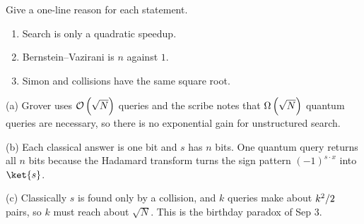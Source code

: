 \begin{exercisebox}
\begin{pproblem}\label{pp:reasons}
    Give a one-line reason for each statement.
    \begin{enumerate}[label=(\alph*)]
        \item Search is only a quadratic speedup.
        \item Bernstein--Vazirani is $n$ against $1$.
        \item Simon and collisions have the same square root.
    \end{enumerate}
\end{pproblem}
\tcblower
\begin{wsolution}
    (a) Grover uses $\mathcal{O}\left(\sqrt{N}\right)$ queries and the scribe notes that $\Omega\left(\sqrt{N}\right)$ quantum
    queries are necessary, so there is no exponential gain for unstructured search.

    (b) Each classical answer is one bit and $s$ has $n$ bits. One quantum query returns all $n$
    bits because the Hadamard transform turns the sign pattern $(-1)^{s \cdot x}$ into $\ket{s}$.

    (c) Classically $s$ is found only by a collision, and $k$ queries make about $k^2/2$
    pairs, so $k$ must reach about $\sqrt{N}$. This is the birthday paradox of Sep 3.
\end{wsolution}
\end{exercisebox}
